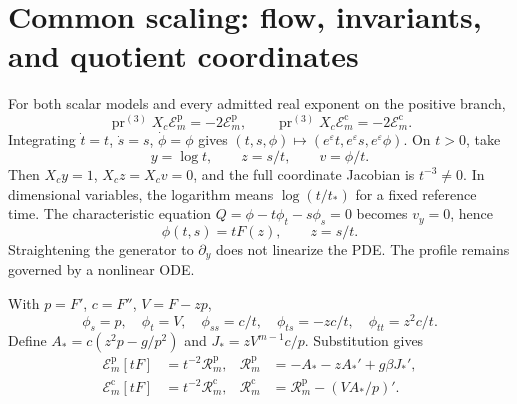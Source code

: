 \documentclass[11pt,a4paper,oneside]{report}
\numberwithin{equation}{chapter}
\newcommand{\E}{\mathcal E}
\newcommand{\R}{\mathcal R}
\newcommand{\pr}{\operatorname{pr}}
\begin{document}
\section{Common scaling: flow, invariants, and quotient coordinates}
For both scalar models and every admitted real exponent on the positive branch,
\begin{equation}\label{eq:commonidentity}
\pr^{(3)}X_c\E_m^{\mathrm p}=-2\E_m^{\mathrm p},\qquad
\pr^{(3)}X_c\E_m^{\mathrm c}=-2\E_m^{\mathrm c}.
\end{equation}
Integrating $\dot t=t$, $\dot s=s$, $\dot\phi=\phi$ gives
$(t,s,\phi)\mapsto(e^\varepsilon t,e^\varepsilon s,e^\varepsilon\phi)$.
On $t>0$, take
\begin{equation}\label{eq:chart}
y=\log t,\qquad z=s/t,\qquad v=\phi/t.
\end{equation}
Then $X_cy=1$, $X_cz=X_cv=0$, and the full coordinate Jacobian is $t^{-3}\ne0$. In dimensional variables, the logarithm means $\log(t/t_*)$ for a fixed reference time. The characteristic equation
$Q=\phi-t\phi_t-s\phi_s=0$ becomes $v_y=0$, hence
\begin{equation}\label{eq:ansatz}
\phi(t,s)=tF(z),\qquad z=s/t.
\end{equation}
Straightening the generator to $\partial_y$ does not linearize the PDE. The profile remains governed by a nonlinear ODE.

With $p=F'$, $c=F''$, $V=F-zp$,
\begin{equation}
\phi_s=p,\quad\phi_t=V,\quad
\phi_{ss}=c/t,\quad\phi_{ts}=-zc/t,\quad\phi_{tt}=z^2c/t.
\end{equation}
Define $A_*=c(z^2p-g/p^2)$ and $J_*=zV^{m-1}c/p$. Substitution gives
\begin{align}
\E_m^{\mathrm p}[tF]&=t^{-2}\R_m^{\mathrm p},&
\R_m^{\mathrm p}&=-A_*-zA_*'+g\beta J_*',\\
\E_m^{\mathrm c}[tF]&=t^{-2}\R_m^{\mathrm c},&
\R_m^{\mathrm c}&=\R_m^{\mathrm p}-(VA_*/p)'.
\end{align}
\end{document}
